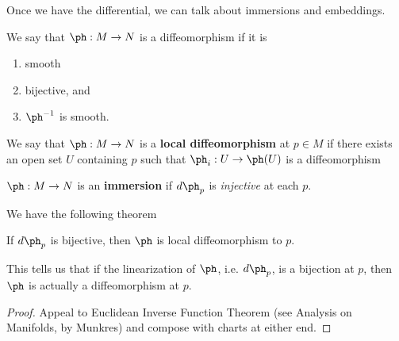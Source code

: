 \vskip0.15in
Once we have the differential, we can talk about immersions and embeddings. 
\begin{df}
We say that 
$\ph:M\to N$ is a diffeomorphism if it is
\begin{enumerate}
\item
smooth
\item
bijective, and
\item $\ph^{-1}$ is smooth.
\end{enumerate}
\end{df}
\begin{df}
We say that $\ph:M\to N$ is a \textbf{local diffeomorphism} at $p\in M$ if there exists an open set $U$ containing $p$ such that $\ph_i:U\to \ph(U)$ is a diffeomorphism
\end{df}
\begin{df}
$\ph:M\to N$ is an \textbf{immersion} if $d\ph_p$ is \emph{injective} at each $p$.
\end{df}
We have the following theorem
\begin{thm}
If $d\ph_p$ is bijective, then $\ph$ is local diffeomorphism to $p$.
\end{thm}
This tells us that if the linearization of $\ph$, i.e. $d\ph_p$, is a bijection at $p$, then  $\ph$ is actually a diffeomorphism at $p$.
\begin{proof}
Appeal to Euclidean Inverse Function Theorem (see Analysis on Manifolds, by Munkres) and compose with charts at either end.
\end{proof}
